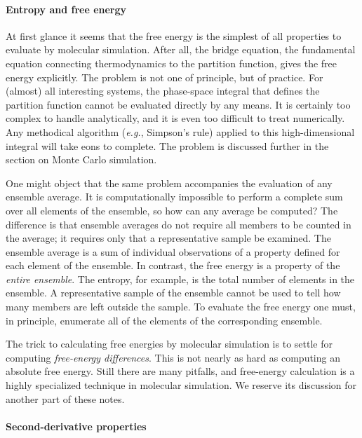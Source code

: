 \documentclass[]{article}
\let\oldparagraph\paragraph
\renewcommand{\paragraph}[1]{\oldparagraph{#1}\mbox{}}
\begin{document}
\paragraph{Entropy and free energy}\label{entropy-and-free-energy}

At first glance it seems that the free energy is the simplest of all
properties to evaluate by molecular simulation. After all, the bridge
equation, the fundamental equation connecting thermodynamics to the
partition function, gives the free energy explicitly. The problem is not
one of principle, but of practice. For (almost) all interesting systems,
the phase-space integral that defines the partition function cannot be
evaluated directly by any means. It is certainly too complex to handle
analytically, and it is even too difficult to treat numerically. 
Any
methodical algorithm (\emph{e.g.}, Simpson's rule) applied to this
high-dimensional integral will take eons to complete. The problem is
discussed further in the section on Monte Carlo simulation.

One might object that the same problem accompanies the evaluation of any
ensemble average. It is computationally impossible to perform a complete
sum over all elements of the ensemble, so how can any average be
computed? The difference is that ensemble averages do not require all
members to be counted in the average; it requires only that a
representative sample be examined. The ensemble average is a sum of
individual observations of a property defined for each element of the
ensemble. In contrast, the free energy is a property of the \emph{entire
ensemble}. The entropy, for example, is the total number of elements in
the ensemble. A representative sample of the ensemble cannot be used to
tell how many members are left outside the sample. To evaluate the free
energy one must, in principle, enumerate all of the elements of the
corresponding ensemble.

The trick to calculating free energies by molecular simulation is to
settle for computing \emph{free-energy differences}. This is not nearly
as hard as computing an absolute free energy. Still there are many
pitfalls, and free-energy calculation is a highly specialized technique
in molecular simulation. We reserve its discussion for another part of
these notes.

\paragraph{Second-derivative
properties}\label{second-derivative-properties}
\end{document}
